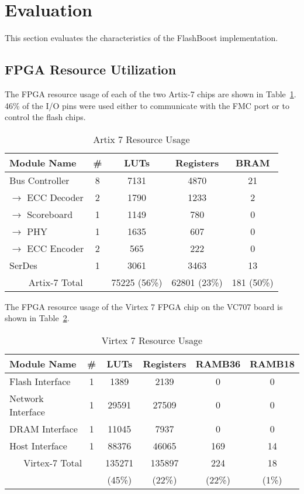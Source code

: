 \section{Evaluation}
\label{sec:results}

This section evaluates the characteristics of the FlashBoost implementation.

\subsection{FPGA Resource Utilization}

The FPGA resource usage of each of the two Artix-7 chips are shown in
Table~\ref{tab:artixutil}. 46\% of the I/O pins were used either to communicate
with the FMC port or to control the flash chips.

\begin{table}[h]\footnotesize
\centering
\begin{tabular}{l | c | c | c | c |}
Module Name & \# & LUTs & Registers & BRAM \\
\hline \hline
Bus Controller & 8 & 7131 & 4870 & 21 \\
$\rightarrow$ ECC Decoder & 2 & 1790 & 1233 & 2 \\
$\rightarrow$ Scoreboard & 1 & 1149 & 780 & 0 \\
$\rightarrow$ PHY & 1 & 1635 & 607 & 0 \\
$\rightarrow$ ECC Encoder & 2 & 565 & 222 & 0 \\
\hline
SerDes & 1 & 3061 & 3463 & 13 \\
\hline \hline
\multicolumn{2}{c}{
Artix-7 Total
} & 75225 (56\%) & 62801 (23\%) & 181 (50\%)
\end{tabular}
\caption{Artix 7 Resource Usage}
\label{tab:artixutil}
\end{table}

The FPGA resource usage of the Virtex 7 FPGA chip on the VC707 board is shown in
Table~\ref{tab:virtexutil}.

\begin{table}[h]\footnotesize
\centering
\begin{tabular}{l | c | c | c | c | c |}
Module Name & \# & LUTs & Registers & RAMB36 & RAMB18 \\
\hline \hline
Flash Interface & 1 & 1389 & 2139 & 0 & 0 \\
Network Interface& 1 & 29591 & 27509 & 0 & 0\\
DRAM Interface& 1 & 11045 & 7937 & 0  & 0\\
Host Interface& 1 & 88376 & 46065 & 169 & 14 \\
\hline \hline
\multicolumn{2}{c}{
Virtex-7 Total
} & 135271& 135897 & 224 & 18 \\
\multicolumn{2}{c}{
} & (45\%) & (22\%) & (22\%) & (1\%)
\end{tabular}
\caption{Virtex 7 Resource Usage}
\label{tab:virtexutil}
\end{table}


